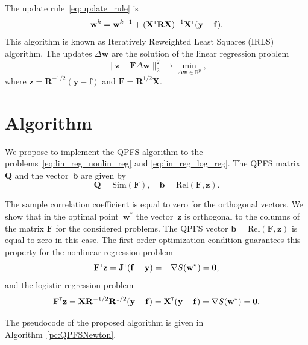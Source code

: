 \documentclass[
11pt,%
tightenlines,%
twoside,%
onecolumn,%
nofloats,%
nobibnotes,%
nofootinbib,%
superscriptaddress,%
noshowpacs,%
centertags]%
{revtex4}
\newcommand{\bb}{\mathbf{b}}
\newcommand{\bw}{\mathbf{w}}
\newcommand{\by}{\mathbf{y}}
\newcommand{\bz}{\mathbf{z}}
\newcommand{\bJ}{\mathbf{J}}
\newcommand{\bQ}{\mathbf{Q}}
\newcommand{\bbR}{\mathbb{R}}
\newcommand{\bF}{\mathbf{F}}
\newcommand{\bR}{\mathbf{R}}
\newcommand{\bX}{\mathbf{X}}
\newcommand{\T}{{\text{\tiny\sffamily\upshape\mdseries T}}}
\begin{document}
The update rule~\eqref{eq:update_rule} is
\[
\bw^k = \bw^{k - 1} + (\bX^{\T} \bR \bX)^{-1} \bX^{\T} (\by - \mathbf{f}).
\]
This algorithm is known as Iteratively Reweighted Least Squares (IRLS) algorithm. The updates $\Delta \bw$ are the solution of the linear regression problem
\begin{equation}
\| \bz - \bF \Delta \bw \|_2^2 \rightarrow \min_{\Delta \bw \in \bbR^{p}},
\label{eq:lin_reg_log_reg}
\end{equation}
where $\bz = \bR^{-1/2} (\by - \mathbf{f})$ and $\bF = \bR^{1/2}\bX$.

\section{Algorithm}

We propose to implement the QPFS algorithm to the problems~\eqref{eq:lin_reg_nonlin_reg} and \eqref{eq:lin_reg_log_reg}. 
The QPFS matrix~$\bQ$ and the vector~$\bb$ are given by
\[
\bQ = \text{Sim} (\bF), \quad \bb = \text{Rel} (\bF, \bz).
\]

The sample correlation coefficient is equal to zero for the orthogonal vectors.
We show that in the optimal point~$\bw^*$ the vector~$\bz$ is orthogonal to the columns of the matrix $\bF$ for the considered problems. 
The QPFS vector $\bb = \text{Rel} (\bF, \bz)$ is equal to zero in this case.
The first order optimization condition guarantees this property for the nonlinear regression problem
\[
\bF^{\T} \bz = \bJ^{\T} (\mathbf{f} - \by) = - \nabla S(\bw^*) = \boldsymbol{0},
\]
and the logistic regression problem
\[
\bF^{\T} \bz = \bX \bR^{-1/2} \bR^{1/2} (\by - \mathbf{f}) = \bX^{\T} (\by - \mathbf{f}) = \nabla S(\bw^*) = \boldsymbol{0}.
\]

The pseudocode of the proposed algorithm is given in Algorithm~\ref{pc:QPFSNewton}.
\end{document}
